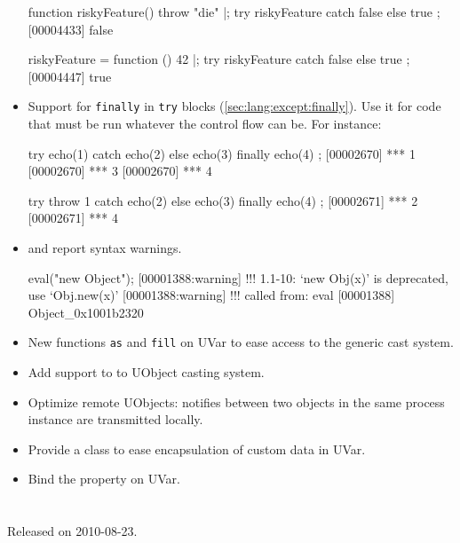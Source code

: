 \begin{itemize}
\begin{urbiscript}
function riskyFeature() { throw "die" }|;
try { riskyFeature } catch { false } else { true };
[00004433] false

riskyFeature = function () { 42 }|;
try { riskyFeature } catch { false } else { true };
[00004447] true
\end{urbiscript}

\item Support for \lstinline|finally| in \lstinline|try| blocks
  (\autoref{sec:lang:except:finally}).  Use it for code that must be run
  whatever the control flow can be.  For instance:
\begin{urbiscript}
try { echo(1) } catch { echo(2) } else { echo(3) } finally { echo(4) };
[00002670] *** 1
[00002670] *** 3
[00002670] *** 4

try { throw 1 } catch { echo(2) } else { echo(3) } finally { echo(4) };
[00002671] *** 2
[00002671] *** 4
\end{urbiscript}

\item {} and  report syntax
  warnings.
\begin{urbiscript}
eval("new Object");
[00001388:warning] !!! 1.1-10: `new Obj(x)' is deprecated, use `Obj.new(x)'
[00001388:warning] !!!    called from: eval
[00001388] Object_0x1001b2320
\end{urbiscript}
\item New functions \lstinline|as| and \lstinline|fill| on UVar to ease access
to the generic cast system.
\item Add support to  to UObject casting system.
\item Optimize remote UObjects: notifies between two objects in the same
  process instance are transmitted locally.
\item Provide a  class to ease encapsulation of custom data
  in UVar.
\item Bind the  property on UVar.
\end{itemize}


\section{}
Released on 2010-08-23.

